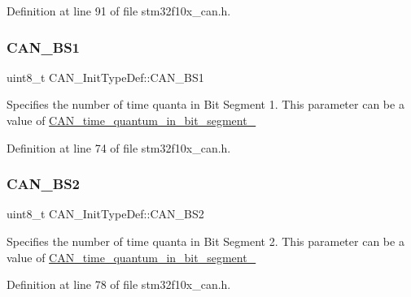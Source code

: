 Definition at line 91 of file stm32f10x\+\_\+can.\+h.

\mbox{\label{struct_c_a_n___init_type_def_aecbd21b55dc88c3a18db93af2836cd58}} 
\subsubsection{\texorpdfstring{C\+A\+N\+\_\+\+B\+S1}{CAN\_BS1}}
{\footnotesize\ttfamily uint8\+\_\+t C\+A\+N\+\_\+\+Init\+Type\+Def\+::\+C\+A\+N\+\_\+\+B\+S1}

Specifies the number of time quanta in Bit Segment 1. This parameter can be a value of \hyperlink{group___c_a_n__time__quantum__in__bit__segment__1}{C\+A\+N\+\_\+time\+\_\+quantum\+\_\+in\+\_\+bit\+\_\+segment\+\_} 

Definition at line 74 of file stm32f10x\+\_\+can.\+h.

\mbox{\label{struct_c_a_n___init_type_def_a693eb00830d6e2aeb4d9fabdba85b9cf}} 
\subsubsection{\texorpdfstring{C\+A\+N\+\_\+\+B\+S2}{CAN\_BS2}}
{\footnotesize\ttfamily uint8\+\_\+t C\+A\+N\+\_\+\+Init\+Type\+Def\+::\+C\+A\+N\+\_\+\+B\+S2}

Specifies the number of time quanta in Bit Segment 2. This parameter can be a value of \hyperlink{group___c_a_n__time__quantum__in__bit__segment__2}{C\+A\+N\+\_\+time\+\_\+quantum\+\_\+in\+\_\+bit\+\_\+segment\+\_} 

Definition at line 78 of file stm32f10x\+\_\+can.\+h.

\mbox{\label{struct_c_a_n___init_type_def_a24816ff18ae048a5ec4bbb22aa2c04f9}} 
